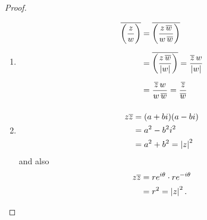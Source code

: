 \documentclass[../MathsNotesBase.tex]{subfiles}
\begin{document}
{\begin{proof}
\begin{enumerate}[label=(\roman*)]
{					\[\begin{aligned}
						\conj{zw} &= \conj{(a + bi)(c + di)} \\
						&= \conj{(ac - bd) + (ad + bc)i} \\
						&= (ac - bd) - (ad + bc)i \\
						&= (a - bi)(c - di) \\
						&= \conj{z} \, \conj{w}.
					\end{aligned}\]
				}
				\item{
					\[\begin{aligned}
						\overline{\left(\frac{z}{w}\right)} &= \overline{ \left(\frac{z \, \overline{w}}{w \, \overline{w}}\right) } \nn
						&= \overline{ \left(\frac{z \, \overline{w}}{\abs{w}}\right) } = \frac{\overline{z} \, w}{\abs{w}} \nn
						&= \frac{\overline{z} \, w}{w \, \overline{w}} = \frac{\overline{z}}{\overline{w}} \nn
					\end{aligned}\]
				}
				\item{
					\[\begin{aligned}
						z \overline{z} &= (a + bi)(a - bi) \\
						&= a^2 - b^2 i^2 \\
						&= a^2 + b^2 = \left\lvert z\right\rvert^2
					\end{aligned}\]
					and also
					\[\begin{aligned}
						z \overline{z} &= re^{i\theta} \cdot re^{-i\theta} \\
						&= r^2 = \left\lvert z\right\rvert^2.
					\end{aligned}\]
				}
			\end{enumerate}
		\end{proof}
		
	}
		
		
\end{document}
